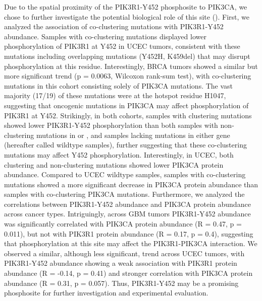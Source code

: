 Due to the spatial proximity of the PIK3R1-Y452 phosphosite to PIK3CA, we chose to further investigate the potential biological role of this site (). First, we analyzed the association of co-clustering mutations with PIK3R1-Y452 abundance. Samples with co-clustering mutations displayed lower phosphorylation of PIK3R1 at Y452 in UCEC tumors, consistent with these mutations including overlapping mutations (Y452H, K459del) that may disrupt phosphorylation at this residue. Interestingly, BRCA tumors showed a similar but more significant trend (p = 0.0063, Wilcoxon rank-sum test), with co-clustering mutations in this cohort consisting solely of PIK3CA mutations. The vast majority (17/19) of these mutations were at the hotspot residue H1047, suggesting that oncogenic mutations in PIK3CA may affect phosphorylation of PIK3R1 at Y452. Strikingly, in both cohorts, samples with clustering mutations showed lower PIK3R1-Y452 phosphorylation than both samples with non-clustering mutations in  or , and samples lacking mutations in either gene (hereafter called wildtype samples), further suggesting that these co-clustering mutations may affect Y452 phosphorylation. Interestingly, in UCEC, both clustering and non-clustering mutations showed lower PIK3CA protein abundance. Compared to UCEC wildtype samples, samples with co-clustering  mutations showed a more significant decrease in PIK3CA protein abundance than samples with co-clustering PIK3CA mutations. Furthermore, we analyzed the correlations between PIK3R1-Y452 abundance and PIK3CA protein abundance across cancer types. Intriguingly, across GBM tumors PIK3R1-Y452 abundance was significantly correlated with PIK3CA protein abundance (R = 0.47, p = 0.011), but not with PIK3R1 protein abundance (R = 0.17, p = 0.4), suggesting that phosphorylation at this site may affect the PIK3R1-PIK3CA interaction. We observed a similar, although less significant, trend across UCEC tumors, with PIK3R1-Y452 abundance showing a weak association with PIK3R1 protein abundance (R = -0.14, p = 0.41) and stronger correlation with PIK3CA protein abundance (R = 0.31, p = 0.057). Thus, PIK3R1-Y452 may be a promising phosphosite for further investigation and experimental evaluation.


